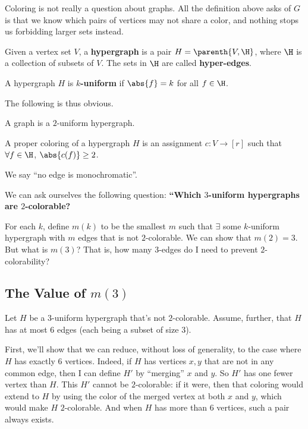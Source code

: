 Coloring is not really a question about graphs. All the definition above asks of $G$ is that we know which pairs of vertices may not share a color, and nothing stops us forbidding larger sets instead.

\begin{boxdefinition}[Hypergraph] \label{Ch1:Def:Hypergraph}
    Given a vertex set $V$, a \textbf{hypergraph} is a pair $H = \parenth{V, \H}$, where $\H$ is a collection of subsets of $V$. The sets in $\H$ are called \textbf{hyper-edges}.
\end{boxdefinition}

\begin{boxdefinition}[Uniformity]
    A hypergraph $H$ is \textbf{$k$-uniform} if $\abs{f} = k$ for all $f \in \H$.
\end{boxdefinition}

The following is thus obvious.

\begin{boxproposition}
    A graph is a $2$-uniform hypergraph.
\end{boxproposition}

\begin{boxdefinition}
A proper coloring of a hypergraph $H$ is an assignment $c : V \to [r]$ such that $\forall f \in \H$, $\abs{c(f)} \geq 2$.
\end{boxdefinition}

We say ``no edge is monochromatic''.

We can ask ourselves the following question: \textbf{``Which $3$-uniform hypergraphs are $2$-colorable?}

For each $k$, define $m(k)$ to be the smallest $m$ such that $\exists$ some $k$-uniform hypergraph with $m$ edges that is not $2$-colorable. We can show that $m(2) = 3$. But what is $m(3)$? That is, how many $3$-edges do I need to prevent $2$-colorability?

\subsection{The Value of $m(3)$}

Let $H$ be a $3$-uniform hypergraph that's not $2$-colorable. Assume, further, that $H$ has at most $6$ edges (each being a subset of size $3$).

First, we'll show that we can reduce, without loss of generality, to the case where $H$ has exactly $6$ vertices. Indeed, if $H$ has vertices $x, y$ that are not in any common edge, then I can define $H'$ by ``merging'' $x$ and $y$. So $H'$ has one fewer vertex than $H$. This $H'$ cannot be $2$-colorable: if it were, then that coloring would extend to $H$ by using the color of the merged vertex at both $x$ and $y$, which would make $H$ $2$-colorable. And when $H$ has more than $6$ vertices, such a pair always exists.

